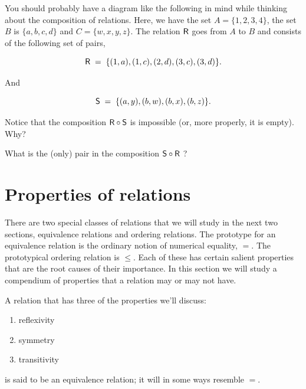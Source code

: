  
You should probably have a diagram like the following in mind while thinking
about the composition of relations.  Here, we have the set $A=\{1,2,3,4\}$,
the set $B$ is $\{a,b,c,d\}$ and $C=\{w,x,y,z\}$.  The relation
$\mbox{\textsf R}$ goes from $A$ to $B$ and consists of the following set of pairs,

\[ \mbox{\textsf R} \; = \; \{(1,a), (1,c), (2,d), (3,c), (3,d) \}. \]

And 

\[ \mbox{\textsf S} \; = \; \{(a,y), (b,w), (b,x), (b,z) \}. \]

\vfill



\begin{exer}
Notice that the composition $\mbox{\textsf R} \circ \mbox{\textsf S}$ is impossible (or, more
properly, it is empty).  Why?

What is the (only) pair in the composition $\mbox{\textsf S} \circ \mbox{\textsf R}$ ?
\end{exer}

\newpage





\newpage

\section{Properties of relations}
\label{sec:rel_props}

There are two special classes of relations that we will study
in the next two sections, equivalence relations and ordering relations.
The prototype for an equivalence relation is the ordinary notion
of numerical equality, $=$.  The prototypical ordering relation
is $\leq$.  Each of these has certain salient properties that are the
root causes of their importance.  In this section we will study a 
compendium of properties that a relation may or may not have.  

A relation that has three of the properties we'll discuss:

\begin{enumerate}
\item {} reflexivity 
\item {}symmetry 
\item {}transitivity
\end{enumerate}

\noindent is said to be an equivalence relation; it will in some ways resemble
$=$.


